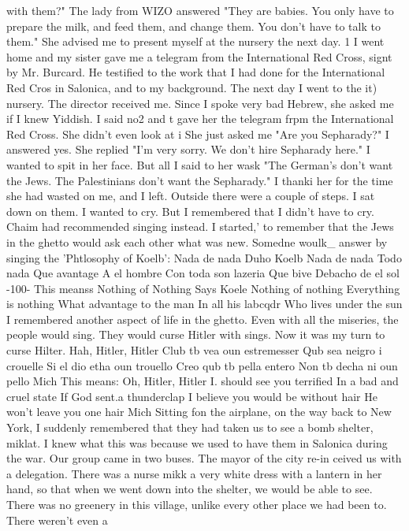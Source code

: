 {{with them?" The lady from WIZO answered "They are babies. You only have to prepare the 
milk, and feed them, and change them. You don't have to talk to them." She advised me 
to present myself at the nursery the next day. 
1 
I went home and my sister gave me a telegram from the International Red Cross, signt 
by Mr. Burcard. He testified to the work that I had done for the International Red Cros 
in Salonica, and to my background. The next day I went to the it) nursery. The director 
received me. Since I spoke very bad Hebrew, she asked me if I knew Yiddish. I said no2 
and t gave her the telegram frpm the International Red Cross. She didn't even look at i 
She just asked me "Are you Sepharady?" I answered yes. She replied "I'm very sorry. 
We don't hire Sepharady here." I wanted to spit in her face. But all I said to her wask 
"The German's don't want the Jews. The Palestinians don't want the Sepharady." I thanki 
her for the time she had wasted on me, and I left. 
Outside there were a couple of steps. I sat down on them. I wanted to cry. But I 
remembered that I didn't have to cry. Chaim had recommended singing instead. I started,' 
to remember that the Jews in the ghetto would ask each other what was new. Somedne woulk_ 
answer by singing the 'Phtlosophy of Koelb': 
Nada de nada 
Duho Koelb 
Nada de nada 
Todo nada 
Que avantage 
A el hombre 
Con toda son lazeria 
Que bive 
Debacho de el sol 
-100- 
This meanss 
Nothing of Nothing 
Says Koele 
Nothing of nothing 
Everything is nothing 
What advantage to the man 
In all his labcqdr 
Who lives under the sun 
I remembered another aspect of life in the ghetto. Even with all the miseries, the people 
would sing. They would curse Hitler with sings. Now it was my turn to curse Hilter. 
Hah, Hitler, Hitler 
Club tb vea oun estremesser 
Qub sea neigro i crouelle 
Si el dio etha oun trouello 
Creo qub tb pella entero 
Non tb decha ni oun pello 
Mich 
This means: 
Oh, Hitler, Hitler 
I. should see you terrified 
In a bad and cruel state 
If God sent.a thunderclap 
I believe you would be without hair 
He won't leave you one hair 
Mich 
Sitting fon the airplane, on the way back to New York, I suddenly remembered that they 
had taken us to see a bomb shelter, miklat. I knew what this was because we used to have 
them in Salonica during the war. Our group came in two buses. The mayor of the city re-in 
ceived us with a delegation. There was a nurse mikk a very white dress with a lantern in 
her hand, so that when we went down into the shelter, we would be able to see. There was 
no greenery in this village, unlike every other place we had been to. There weren't even a 
}}
